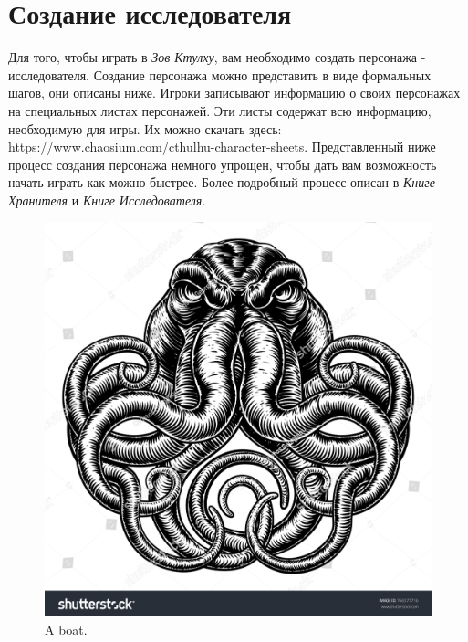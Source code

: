 \documentclass[letterpaper,twocolumn,openany, twoside, 8pt, usenames]{cocbook}
\begin{document}
\section*{\nohyphens{Создание исследователя}}

Для того, чтобы играть в {\it Зов Ктулху}, вам необходимо создать персонажа - исследователя. Создание персонажа можно представить в виде формальных шагов, они описаны ниже. Игроки записывают информацию о своих персонажах на специальных листах персонажей. Эти листы содержат всю информацию, необходимую для игры. Их можно скачать здесь: https://www.chaosium.com/cthulhu-character-sheets.
Представленный ниже процесс создания персонажа немного упрощен, чтобы дать вам возможность начать играть как можно быстрее. Более подробный процесс описан в {\it Книге Хранителя} и {\it Книге Исследователя}.

\begin{figure}
  \includegraphics[width=\linewidth]{img/cthulhu.jpg}
  \caption{A boat.}
  \label{fig:boat1}
\end{figure}

\begin{figure}
\setthemecolor[CoCPaperBox]

\end{figure}
\end{document}
